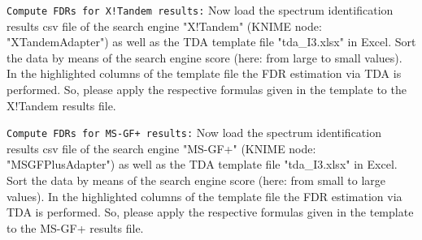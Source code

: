 \begin{task}

\texttt{Compute FDRs for X!Tandem results:} Now load the spectrum identification results csv file of the search engine "X!Tandem" (KNIME node: "XTandemAdapter") as well as the TDA template file "tda\_I3.xlsx" in Excel. Sort the data by means of the search engine score (here: from large to small values). In the highlighted columns of the template file the FDR estimation via TDA is performed. So, please apply the respective formulas given in the template to the X!Tandem results file.

\texttt{Compute FDRs for MS-GF+ results:} Now load the spectrum identification results csv file of the search engine "MS-GF+" (KNIME node: "MSGFPlusAdapter") as well as the TDA template file "tda\_I3.xlsx" in Excel. Sort the data by means of the search engine score (here: from small to large values). In the highlighted columns of the template file the FDR estimation via TDA is performed. So, please apply the respective formulas given in the template to the MS-GF+ results file.


\end{task}
